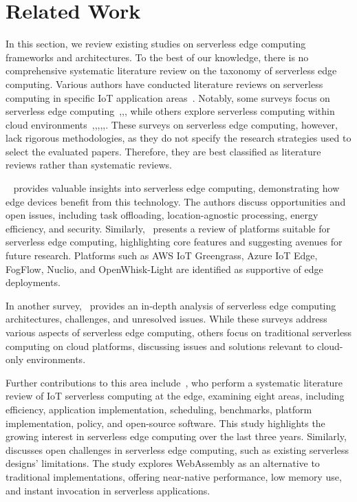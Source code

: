 \section{Related Work}
\label{Relatedwork}
In this section, we review existing studies on serverless edge computing frameworks and architectures. To the best of our knowledge, there is no comprehensive systematic literature review on the taxonomy of serverless edge computing. Various authors have conducted literature reviews on serverless computing in specific IoT application areas~\cite{cassel2022serverless-20}. Notably, some surveys focus on serverless edge computing~\cite{aslanpour2020performance-17},\cite{ioini2020platforms-22},\cite{xie2021serverless-15}, while others explore serverless computing within cloud environments~\cite{taibi2020patterns-24},\cite{eismann2020review-25},\cite{yussupov2019systematic-26},\cite{scheuner2020function-27},\cite{li2022serverless-38},\cite{mampage2022holistic-18}. These surveys on serverless edge computing, however, lack rigorous methodologies, as they do not specify the research strategies used to select the evaluated papers. Therefore, they are best classified as literature reviews rather than systematic reviews.

~\cite{aslanpour2021serverless-21} provides valuable insights into serverless edge computing, demonstrating how edge devices benefit from this technology. The authors discuss opportunities and open issues, including task offloading, location-agnostic processing, energy efficiency, and security. Similarly,~\cite{ioini2020platforms-22} presents a review of platforms suitable for serverless edge computing, highlighting core features and suggesting avenues for future research. Platforms such as AWS IoT Greengrass, Azure IoT Edge, FogFlow, Nuclio, and OpenWhisk-Light are identified as supportive of edge deployments.

In another survey,~\cite{xie2021serverless-15} provides an in-depth analysis of serverless edge computing architectures, challenges, and unresolved issues. While these surveys address various aspects of serverless edge computing, others focus on traditional serverless computing on cloud platforms, discussing issues and solutions relevant to cloud-only environments.

Further contributions to this area include~\cite{kjorveziroski2021iot-48}, who perform a systematic literature review of IoT serverless computing at the edge, examining eight areas, including efficiency, application implementation, scheduling, benchmarks, platform implementation, policy, and open-source software. This study highlights the growing interest in serverless edge computing over the last three years. Similarly,~\cite{gadepalli2019challenges-49} discusses open challenges in serverless edge computing, such as existing serverless designs' limitations. The study explores WebAssembly as an alternative to traditional implementations, offering near-native performance, low memory use, and instant invocation in serverless applications.

